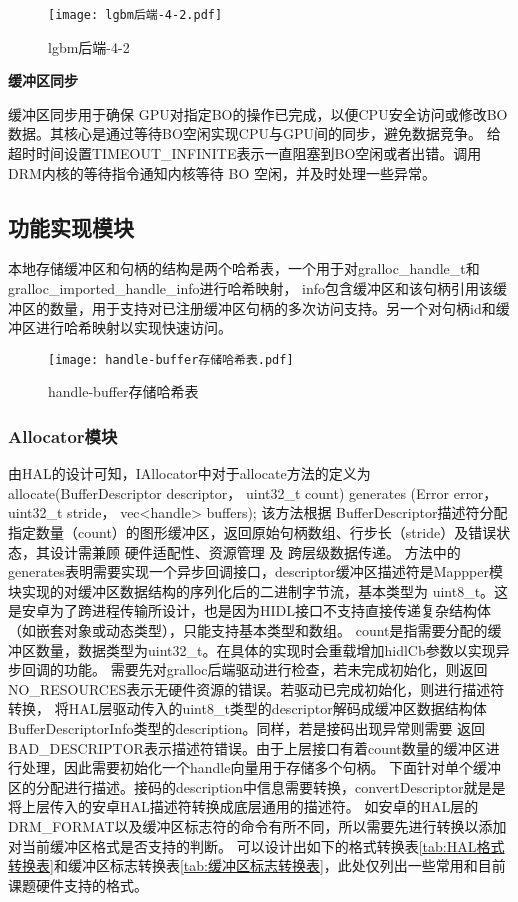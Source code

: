 \begin{figure}[H]
  \centering
  \texttt{[image: lgbm后端-4-2.pdf]}
  \caption{lgbm后端-4-2}
  \label{fig:lgbm后端-4-2}
\end{figure} 

\textbf{缓冲区同步}

缓冲区同步用于确保 GPU对指定BO的操作已完成，以便CPU安全访问或修改BO数据。其核心是通过​等待BO空闲​实现CPU与GPU间的同步，避免数据竞争。
给超时时间设置TIMEOUT\_INFINITE表示一直阻塞到BO空闲或者出错。调用DRM内核的等待指令通知内核等待 BO 空闲，并及时处理一些异常。

\subsection{功能实现模块}

本地存储缓冲区和句柄的结构是两个哈希表，一个用于对gralloc\_handle\_t和gralloc\_imported\_handle\_info进行哈希映射，
info包含缓冲区和该句柄引用该缓冲区的数量，用于支持对已注册缓冲区句柄的多次访问支持。另一个对句柄id和缓冲区进行哈希映射以实现快速访问。

\begin{figure}[H]
  \centering
  \texttt{[image: handle-buffer存储哈希表.pdf]}
  \caption{handle-buffer存储哈希表}
  \label{fig:handle-buffer存储哈希表}
\end{figure}

\subsubsection{Allocator模块}
由HAL的设计可知，IAllocator中对于allocate方法的定义为
allocate(BufferDescriptor descriptor， uint32\_t count) generates (Error error， uint32\_t stride， vec<handle> buffers);
该方法根据 BufferDescriptor描述符分配指定数量（count）的图形缓冲区，返回原始句柄数组、行步长（stride）及错误状态，其设计需兼顾 硬件适配性、资源管理 及 跨层级数据传递。
方法中的generates表明需要实现一个异步回调接口，descriptor缓冲区描述符是Mappper模块实现的对缓冲区数据结构的序列化后的二进制字节流，基本类型为
uint8\_t。这是安卓为了跨进程传输所设计，也是因为HIDL接口不支持直接传递复杂结构体（如嵌套对象或动态类型），只能支持基本类型和数组。
count是指需要分配的缓冲区数量，数据类型为uint32\_t。在具体的实现时会重载增加hidlCb参数以实现异步回调的功能。
需要先对gralloc后端驱动进行检查，若未完成初始化，则返回NO\_RESOURCES表示无硬件资源的错误。若驱动已完成初始化，则进行描述符转换，
将HAL层驱动传入的uint8\_t类型的descriptor解码成缓冲区数据结构体BufferDescriptorInfo类型的description。同样，若是接码出现异常则需要
返回BAD\_DESCRIPTOR表示描述符错误。由于上层接口有着count数量的缓冲区进行处理，因此需要初始化一个handle向量用于存储多个句柄。
下面针对单个缓冲区的分配进行描述。接码的description中信息需要转换，convertDescriptor就是是将上层传入的安卓HAL描述符转换成底层通用的描述符。
如安卓的HAL层的DRM\_FORMAT以及缓冲区标志符的命令有所不同，所以需要先进行转换以添加对当前缓冲区格式是否支持的判断。
可以设计出如下的格式转换表\ref{tab:HAL格式转换表}和缓冲区标志转换表\ref{tab:缓冲区标志转换表}，此处仅列出一些常用和目前课题硬件支持的格式。

